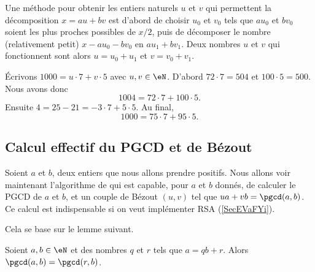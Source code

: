 \begin{normaltext}
    Une méthode pour obtenir les entiers naturels $u$ et $v$ qui permettent la décomposition \(x = au + bv \) est d'abord de choisir $u_0$ et $v_0$ tels que \( au_0 \) et \( bv_0 \) soient les plus proches possibles de $x/2$, puis de décomposer le nombre (relativement petit) \( x - au_0 - bv_0 \) en \( au_1 + bv_1 \). Deux nombres $u$ et $v$ qui fonctionnent sont alors $u = u_0 + u_1$ et $v = v_0 + v_1$.
\end{normaltext}

\begin{example}
    Écrivons \( 1000=u\cdot 7+v\cdot 5\) avec \( u,v\in \eN\). D'abord \( 72\cdot 7=504\) et \( 100\cdot 5=500\). Nous avons donc
    \begin{equation}
        1004=72\cdot 7+100\cdot 5.
    \end{equation}
    Ensuite \( 4=25-21=-3\cdot 7+5\cdot 5\). Au final,
    \begin{equation}
        1000=75\cdot 7+95\cdot 5.
    \end{equation}
\end{example}

\subsection{Calcul effectif du PGCD et de Bézout}
\label{subSecIpmnhO}

Soient \( a\) et \( b\), deux entiers que nous allons prendre positifs. Nous allons voir maintenant l'algorithme de  qui est capable, pour \( a\) et \( b\) donnés, de calculer le PGCD de $a$ et $b$, et un couple de Bézout \( (u,v)\) tel que \( ua+vb=\pgcd(a,b)\). Ce calcul est indispensable si on veut implémenter RSA (\ref{SecEVaFYi}).

Cela se base sur le lemme suivant.

\begin{lemma}       \label{LemiVqita}
    Soient \( a,b\in \eN\) et des nombres \( q\) et \( r\) tels que \( a=qb+r\). Alors \( \pgcd(a,b)=\pgcd(r,b)\).
\end{lemma}

